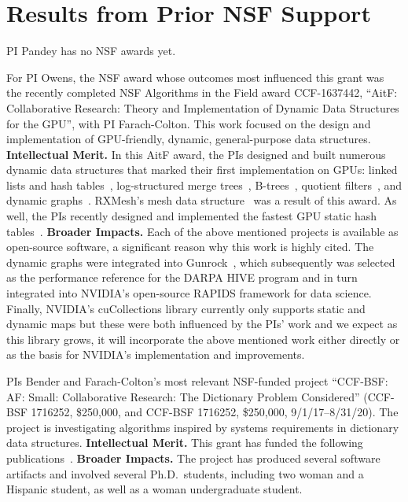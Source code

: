 
\section{Results from Prior NSF Support}

PI Pandey has no NSF awards yet.

For PI Owens, the NSF award whose outcomes most influenced this grant was the recently completed NSF Algorithms in the Field award CCF-1637442, ``AitF\@: Collaborative Research: Theory and Implementation of Dynamic Data Structures for the GPU'', with PI Farach-Colton. This work focused on the design and implementation of GPU-friendly, dynamic, general-purpose data structures.
\textbf{Intellectual Merit.} In this AitF award, the PIs designed and built numerous dynamic data structures that marked their first implementation on GPUs: linked lists and hash tables~\cite{Ashkiani:2018:ADH}, log-structured merge trees~\cite{Ashkiani:2018:GLA}, B-trees~\cite{Awad:2019:EAH}, quotient filters~\cite{GeilFO18}, and dynamic graphs~\cite{Awad:2020:DGO}. RXMesh's mesh data structure~\cite{Mahmoud:2021:RAG} was a result of this award. As well, the PIs recently designed and implemented the fastest GPU static hash tables~\cite{Awad:2023:AAI}.
%
\textbf{Broader Impacts.} Each of the above mentioned projects is available as open-source software, a significant reason why this work is highly cited. The dynamic graphs were integrated into Gunrock~\cite{Awad:2020:DGO,Wang:2017:GGG}, which subsequently was selected as the performance reference for the DARPA HIVE program and in turn integrated into NVIDIA's open-source RAPIDS framework for data science. Finally, NVIDIA's cuCollections library currently only supports static and dynamic maps but these were both influenced by the PIs' work and we expect as this library grows, it will incorporate the above mentioned work either directly or as the basis for NVIDIA's implementation and improvements.

PIs Bender and Farach-Colton's most relevant NSF-funded project ``CCF-BSF\@: AF\@: Small: Collaborative Research: The Dictionary Problem Considered''
(CCF-BSF 1716252, \$250,000, and CCF-BSF 1716252, \$250,000, 9/1/17--8/31/20).
The project is investigating algorithms inspired by systems requirements in dictionary data structures.
\textbf{Intellectual Merit.} This grant has funded the following
publications~\cite{AgrawalBeDa20,AgrawalBeFi20,%
ArkinDaGa20,Ashkiani:2018:ADH,Ashkiani:2018:GLA,BenderChDa20,BenderCoFa19,BenderDaJo20,BenderFaGo18,%
BenderFaKu19,BenderGoMe20,BenderKoKu20,ChenMcSi18,ConwayBaJi17b,ConwayFaSh18,ConwayKnJi19,%
DasAgBe20,DasTsDu19,BerceaEv20a,BerceaEv20b,%
ZhanCoJi18,ZhanJaPo18,Mayer18,Pandey19,PandeyAlBe18,PandeyBJP17,%
PandeyBeJo18,Singh18,SinghMaBe20,%
JavanmardGaDa19DISC,%
GoswamiMeMe18,%
GeilFO18,pandey2020timely,%
EvenMeRa18,Awad:2019:EAH,BenderFiGi19,Farach-ColtonLiTs18,BenderKoPe18}.
%
\textbf{Broader Impacts.} The project has produced several software artifacts and involved several Ph.D.\ students, including two woman and a Hispanic student, as well as a woman undergraduate student.

